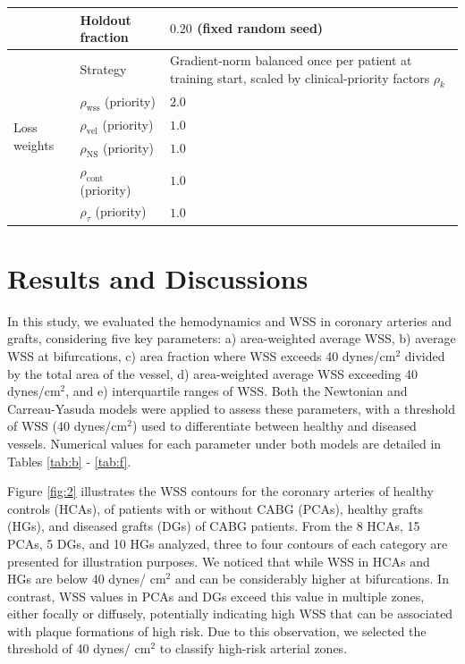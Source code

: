 ﻿\documentclass[12pt,a4paper]{article}
\theoremstyle{definition}
\numberwithin{equation}{section}
\begin{document}
\begin{table}[H]
\begin{tabular}{|l|p{4.6cm}|p{6.6cm}|}
 & Holdout fraction & $0.20$ (fixed random seed) \\ \hline
\multirow{6}{*}{Loss weights}
 & Strategy & Gradient-norm balanced once per patient at training start, scaled by clinical-priority factors $\rho_k$ \\ \cline{2-3}
 & $\rho_{\text{wss}}$ (priority) & $2.0$ \\ \cline{2-3}
 & $\rho_{\text{vel}}$ (priority) & $1.0$ \\ \cline{2-3}
 & $\rho_{\text{NS}}$ (priority) & $1.0$ \\ \cline{2-3}
 & $\rho_{\text{cont}}$ (priority) & $1.0$ \\ \cline{2-3}
 & $\rho_{\tau}$ (priority) & $1.0$ \\ \hline
\end{tabular}
\end{table}


\section{\label{Results and Discussions}Results and Discussions} \hspace*{\parindent}  In this study, we evaluated the hemodynamics and WSS in coronary arteries and grafts, considering five key parameters: a) area-weighted average WSS, b) average WSS at bifurcations, c) area fraction where WSS exceeds 40 dynes/cm$^2$ divided by the total area of the vessel, d) area-weighted average WSS exceeding 40 dynes/cm$^2$, and e) interquartile ranges of WSS. Both the Newtonian and Carreau-Yasuda models were applied to assess these parameters, with a threshold of WSS (40 dynes/cm$^2$) used to differentiate between healthy and diseased vessels. Numerical values for each parameter under both models are detailed in Tables \ref{tab:b} - \ref{tab:f}.


  
Figure \ref{fig:2} illustrates the WSS contours for the coronary arteries of healthy controls (HCAs), of patients with or without CABG (PCAs), healthy grafts (HGs), and diseased grafts (DGs) of CABG patients. From the 8 HCAs, 15 PCAs, 5 DGs, and 10 HGs analyzed, three to four contours of each category are presented for illustration purposes. We noticed that while WSS in HCAs and HGs are below 40 dynes/ cm$^2$ and can be considerably higher at bifurcations. In contrast, WSS values in PCAs and DGs exceed this value in multiple zones, either focally or diffusely, potentially indicating  high WSS that can be associated with plaque formations of high risk. Due to this observation, we selected the threshold of 40 dynes/ cm$^2$ to classify high-risk arterial zones. 
\end{document}
